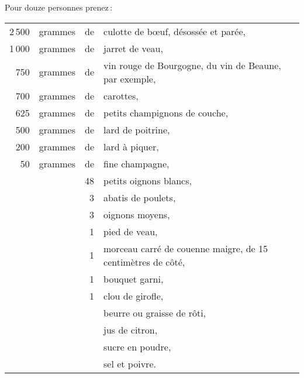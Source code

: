 Pour douze personnes prenez :

\medskip

\footnotesize
\begin{longtable}{rrrp{16em}}
  2 500 & grammes & de & culotte de bœuf, désossée et parée,                                              \\
  1 000 & grammes & de & jarret de veau,                                                                  \\
    750 & grammes & de & vin rouge de Bourgogne, du vin de Beaune, par exemple,                           \\
    700 & grammes & de & carottes,                                                                        \\
    625 & grammes & de & petits champignons de couche,                                                    \\
    500 & grammes & de & lard de poitrine,                                                                \\
    200 & grammes & de & lard à piquer,                                                                   \\
     50 & grammes & de & fine champagne,                                                                  \\
        &         & 48 & petits oignons blancs,                                                           \\
        &         &  3 & abatis de poulets,                                                               \\
        &         &  3 & oignons moyens,                                                                  \\
        &         &  1 & pied de veau,                                                                    \\
        &         &  1 & morceau carré de couenne maigre, de 15 centimètres de côté,                      \\
        &         &  1 & bouquet garni,                                                                   \\
        &         &  1 & clou de girofle,                                                                 \\
        &         &    & beurre ou graisse de rôti,                                                       \\
        &         &    &jus de citron,                                                                    \\
        &         &    &sucre en poudre,                                                                  \\
        &         &    &sel et poivre.                                                                    \\
\end{longtable}
\normalsize

